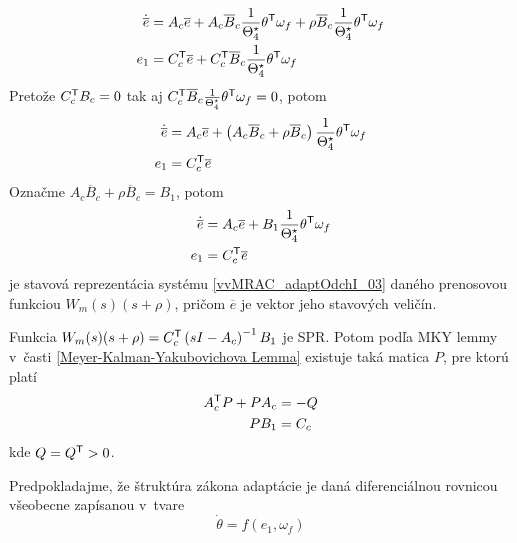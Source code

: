 \documentclass[a4paper, 10pt, ]{article}
\begin{document}
\begin{subequations}
	\begin{align}
		\dot{\overline{e}} &= A_c \overline{e} + A_c \overline{B}_c \frac{1}{\Theta_4^\star} \theta^{\mathsf{T}} \omega_f + \rho \overline{B}_c \frac{1}{\Theta_4^\star} \theta^{\mathsf{T}} \omega_f \\
		e_1 &= C_c^{\mathsf{T}} \overline{e} + C_c^{\mathsf{T}} \overline{B}_c \frac{1}{\Theta_4^\star} \theta^{\mathsf{T}} \omega_f
	\end{align}
\end{subequations}
Pretože $C_c^{\mathsf{T}} {B}_c = 0$ tak aj $C_c^{\mathsf{T}} \overline{B}_c \frac{1}{\Theta_4^\star} \theta^{\mathsf{T}} \omega_f = 0 $, potom
\begin{subequations}
	\begin{align}
		\dot{\overline{e}} &= A_c \overline{e} + \left( A_c \overline{B}_c + \rho \overline{B}_c \right) \frac{1}{\Theta_4^\star} \theta^{\mathsf{T}} \omega_f \\
		e_1 &= C_c^{\mathsf{T}} \overline{e}
	\end{align}
\end{subequations}
Označme $A_c \overline{B}_c + \rho \overline{B}_c = B_1 $, potom
\begin{subequations} \label{vvMRAC_adaptOdchISS2}
	\begin{align}
        \dot{\overline{e}} &= A_c \overline{e} + B_1 \frac{1}{\Theta_4^\star} \theta^{\mathsf{T}} \omega_f \\
		e_1 &= C_c^{\mathsf{T}} \overline{e}
	\end{align}
\end{subequations}
je stavová reprezentácia systému \eqref{vvMRAC_adaptOdchI_03} daného prenosovou funkciou $W_m(s)(s + \rho)$, pričom $\overline{e}$ je vektor jeho stavových veličín.

Funkcia $W_m(s)(s + \rho) = C_c^{\mathsf{T}} \left( s I - A_c \right)^{-1} B_1$ je SPR. Potom podľa MKY lemmy v~časti \ref{Meyer-Kalman-Yakubovichova Lemma} existuje taká matica $P$, pre ktorú platí
\begin{subequations} \label{vvMRAC_dosledkyMKYlemmyn2}
	\begin{align}
		A_c^{\mathsf{T}} P  +  P {A_c} &=  - Q \\
		P  B_1 &= {C_c}
	\end{align}
\end{subequations}
kde $Q = Q^{\mathsf{T}} > 0$.

Predpokladajme, že štruktúra zákona adaptácie je daná diferenciálnou rovnicou všeobecne zapísanou v~tvare
\begin{equation}
	\dot\theta = f(e_1, \omega_f)
\end{equation}
\end{document}
